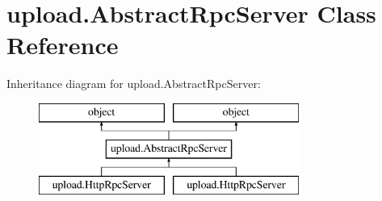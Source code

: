 \hypertarget{classupload_1_1_abstract_rpc_server}{}\section{upload.\+Abstract\+Rpc\+Server Class Reference}
\label{classupload_1_1_abstract_rpc_server}
Inheritance diagram for upload.\+Abstract\+Rpc\+Server\+:\begin{figure}[H]
\begin{center}
\leavevmode
\includegraphics[height=3.000000cm]{db/d9e/classupload_1_1_abstract_rpc_server}
\end{center}
\end{figure}
